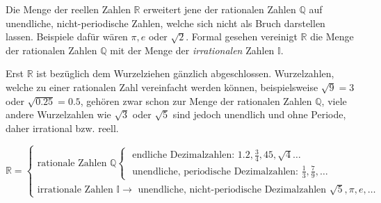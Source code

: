 
Die Menge der reellen Zahlen $\mathbb{R}$ erweitert jene der rationalen Zahlen $\mathbb{Q}$ auf unendliche, nicht-periodische Zahlen, welche sich nicht als Bruch darstellen lassen. Beispiele daf\"{u}r w\"{a}ren $\pi, e$ oder $\sqrt{2}$. Formal gesehen vereinigt $\mathbb{R}$ die Menge der rationalen Zahlen $\mathbb{Q}$ mit der Menge der \emph{irrationalen} Zahlen $\mathbb{I}$. 

Erst $\mathbb{R}$ ist bez\"{u}glich dem Wurzelziehen g\"{a}nzlich abgeschlossen. Wurzelzahlen, welche zu einer rationalen Zahl vereinfacht werden k\"{o}nnen, beispielsweise $\sqrt{9} = 3$ oder $\sqrt{0.25} = 0.5$, geh\"{o}ren zwar schon zur Menge der rationalen Zahlen $\mathbb{Q}$, viele andere Wurzelzahlen wie $\sqrt{3}$ oder $\sqrt{5}$ sind jedoch unendlich und ohne Periode, daher irrational bzw. reell. 
\begin{figure}[h!]
\end{figure}
$$
\mathbb{R} =
\begin{cases}
	\text{rationale Zahlen } \mathbb{Q}
	\begin{cases}
		\text{ endliche Dezimalzahlen: } 1.2, \frac{3}{4}, 45, \sqrt{4} \ldots
		\\
		\text{ unendliche, periodische Dezimalzahlen: } \frac{1}{3}, \frac{7}{9}, \ldots
	\end{cases}
	\\
	\text{irrationale Zahlen } \mathbb{I} \rightarrow
	\text{ unendliche, nicht-periodische Dezimalzahlen } \sqrt{5}, \pi, e, \ldots
\end{cases}
$$

